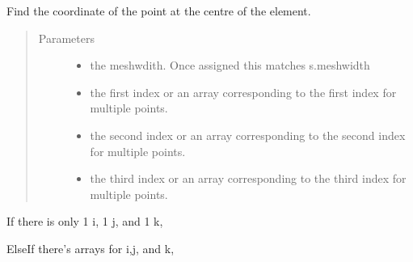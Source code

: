 \documentclass[letterpaper,10pt,english]{sphinxmanual}
\begin{document}
\begin{fulllineitems}
\begin{fulllineitems}
\label{\detokenize{index:Room.room.coordinate}}
Find the co\sphinxhyphen{}ordinate of the point at the centre of the element.
\begin{quote}\begin{description}
\item[{Parameters}] \leavevmode\begin{itemize}
\item {} 
 \textendash{} the meshwdith. Once assigned this matches s.meshwidth

\item {} 
 \textendash{} the first index or an array corresponding to the first     index for multiple points.

\item {} 
 \textendash{} the second index or an array corresponding to the second     index for multiple points.

\item {} 
 \textendash{} the third index or an array corresponding to the third     index for multiple points.

\end{itemize}

\end{description}\end{quote}

If there is only 1 i, 1 j, and 1 k,

\begin{sphinxVerbatim}[commandchars=\\\{\}]
\PYG{p}{[}\PYG{p}{]} \PYG{p}{[}\PYG{p}{]}
\end{sphinxVerbatim}

ElseIf there’s arrays for i,j, and k,


\end{fulllineitems}
\end{fulllineitems}
\end{document}
